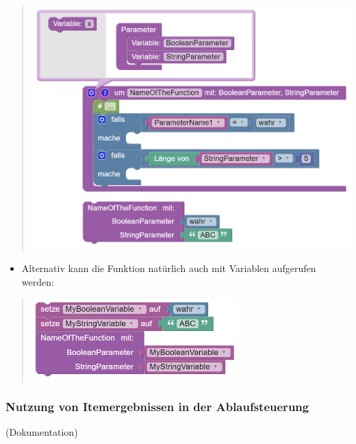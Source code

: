 \documentclass[
  letterpaper,
  DIV=11]{scrreprt}
\providecommand{\tightlist}{%
  \setlength{\itemsep}{0pt}\setlength{\parskip}{0pt}}\usepackage{longtable,booktabs,array}
\begin{document}
\begin{tcolorbox}
\begin{quote}
\includegraphics[width=5.20833in,height=\textheight]{img/screenshot-blockly-function-with-parameters-complete-example-01-DEU.png}
\end{quote}

\begin{itemize}
\tightlist
\item
  Alternativ kann die Funktion natürlich auch mit Variablen aufgerufen
  werden:
\end{itemize}

\begin{quote}
\includegraphics[width=3.125in,height=\textheight]{img/screenshot-blockly-function-with-parameters-complete-example-02-DEU.png}
\end{quote}

\hypertarget{nutzung-von-itemergebnissen-in-der-ablaufsteuerung-1}{%
\subsubsection{Nutzung von Itemergebnissen in der
Ablaufsteuerung}\label{nutzung-von-itemergebnissen-in-der-ablaufsteuerung-1}}

(Dokumentation)

\hypertarget{blockly-operatoren-zum-kodieren-fehlender-werte-1}{%
}
\end{tcolorbox}
\end{document}
